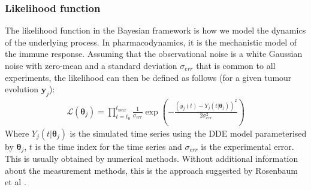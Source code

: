 \documentclass[11pt]{article}
\newcommand*\dif{\mathop{}\!\mathrm{d}}
\begin{document}
\subsubsection{Likelihood function}
The likelihood function in the Bayesian framework is how we model the dynamics of the underlying process. In pharmacodynamics, it is the mechanistic model of the immune response. Assuming that the observational noise is a white Gaussian noise with zero-mean and a standard deviation $\sigma_{err}$ that is common to all experiments, the likelihood can then be defined as follows \cite{liu_wang}\cite{likelihood_2} (for a given tumour evolution $\boldsymbol{y}_j$):
\begin{align*}
    \mathcal{L}(\boldsymbol{\theta}_j) = \prod_{t=t_0}^{t_{max}} \frac{1}{\sigma_{err}} \exp\left(-\frac{(y_{j}(t) - Y_j(t|\boldsymbol{\theta}_j))^2}{2\sigma_{err}^2}\right)  
\end{align*}
Where $Y_j(t|\boldsymbol{\theta}_j)$ is the simulated time series using the DDE model parameterised by $\boldsymbol{\theta}_j$, $t$ is the time index for the time series and $\sigma_{err}$ is the experimental error. This is usually obtained by numerical methods. Without additional information about the measurement methods, this is the approach suggested by Rosenbaum et al \cite{rosenbaum}.





\end{document}

